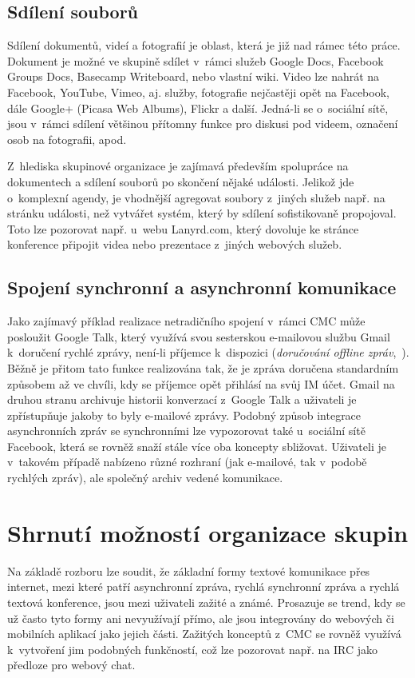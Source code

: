 \documentclass[12pt,oneside,final]{fithesis2}
\begin{document}
\subsection{Sdílení souborů}
Sdílení dokumentů, videí a fotografií je oblast, která je již nad rámec této práce. Dokument je možné ve skupině sdílet v~rámci služeb Google Docs, Facebook Groups Docs, Basecamp Writeboard, nebo vlastní wiki. Video lze nahrát na Facebook, YouTube, Vimeo, aj. služby, fotografie nejčastěji opět na Facebook, dále Google+ (Picasa Web Albums), Flickr a další. Jedná-li se o~sociální sítě, jsou v~rámci sdílení většinou přítomny funkce pro diskusi pod videem, označení osob na fotografii, apod.

Z~hlediska skupinové organizace je zajímavá především spolupráce na dokumentech a sdílení souborů po skončení nějaké události. Jelikož jde o~komplexní agendy, je vhodnější agregovat soubory z~jiných služeb např. na stránku události, než vytvářet systém, který by sdílení sofistikovaně propojoval. Toto lze pozorovat např. u~webu Lanyrd.com, který dovoluje ke stránce konference připojit videa nebo prezentace z~jiných webových služeb.

\subsection{Spojení synchronní a asynchronní komunikace}\label{syncAsync}
Jako zajímavý příklad realizace netradičního spojení v~rámci CMC může posloužit Google Talk, který využívá svou sesterskou e-mailovou službu Gmail k~doručení rychlé zprávy, není-li příjemce k~dispozici (\emph{doručování offline zpráv},~\cite{lindberg2006offline}). Běžně je přitom tato funkce realizována tak, že je zpráva doručena standardním způsobem až ve chvíli, kdy se příjemce opět přihlásí na svůj IM účet. Gmail na druhou stranu archivuje historii konverzací z~Google Talk a uživateli je zpřístupňuje jakoby to byly e-mailové zprávy. Podobný způsob integrace asynchronních zpráv se synchronními lze vypozorovat také u~sociální sítě Facebook, která se rovněž snaží stále více oba koncepty sbližovat. Uživateli je v~takovém případě nabízeno různé rozhraní (jak e-mailové, tak v~podobě rychlých zpráv), ale společný archiv vedené komunikace.


\section{Shrnutí možností organizace skupin}\label{optionsConclusion}
Na základě rozboru lze soudit, že základní formy textové komunikace přes internet, mezi které patří asynchronní zpráva, rychlá synchronní zpráva a rychlá textová konference, jsou mezi uživateli zažité a známé. Prosazuje se trend, kdy se už často tyto formy ani nevyužívají přímo, ale jsou integrovány do webových či mobilních aplikací jako jejich části. Zažitých konceptů z~CMC se rovněž využívá k~vytvoření jim podobných funkčností, což lze pozorovat např. na IRC jako předloze pro webový chat.
\end{document}
